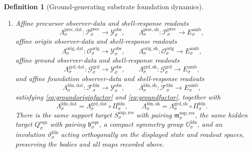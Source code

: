 \documentclass[11pt]{article}
\newcommand{\DataSpace}[1]{\mathcal Y_{#1}^{\mathrm{obs}}}
\newcommand{\AmbientTarget}[1]{E_{#1}^{\mathrm{amb}}}
\newcommand{\ResTarget}[1]{S_{#1}^{\mathrm{sup,res}}}
\newcommand{\ResPair}[1]{\mathfrak m_{#1}^{\mathrm{sup,res}}}
\newcommand{\LiftSelect}[1]{\mathfrak s_{#1}^{\mathrm{lift}}}
\newcommand{\LiftFunctional}[1]{\mathscr V_{#1}^{\mathrm{lift}}}
\newcommand{\PrecSpace}[1]{\mathcal P_{#1}^{\mathrm{prec}}}
\newcommand{\PrecLiftMin}[1]{\mathfrak f_{#1}^{\mathrm{prec}}}
\newcommand{\PrecSubMin}[1]{\mathfrak m_{#1}^{\mathrm{prec}}}
\newcommand{\PrecFunctional}[1]{\mathscr W_{#1}^{\mathrm{prec}}}
\newcommand{\PrecData}[1]{\Lambda_{#1}^{\mathrm{prec,dat}}}
\newcommand{\PrecShellMap}[1]{\Lambda_{#1}^{\mathrm{prec,sh}}}
\newcommand{\OrigSpace}[1]{\mathcal O_{#1}^{\mathrm{orig}}}
\newcommand{\OrigPrecMin}[1]{\mathfrak f_{#1}^{\mathrm{orig,prec}}}
\newcommand{\OrigLiftMin}[1]{\mathfrak f_{#1}^{\mathrm{orig,lift}}}
\newcommand{\OrigSubMin}[1]{\mathfrak m_{#1}^{\mathrm{orig}}}
\newcommand{\OrigFunctional}[1]{\mathscr W_{#1}^{\mathrm{orig}}}
\newcommand{\OrigData}[1]{\Lambda_{#1}^{\mathrm{orig,dat}}}
\newcommand{\OrigShellMap}[1]{\Lambda_{#1}^{\mathrm{orig,sh}}}
\newcommand{\GroundSpace}[1]{\mathcal G_{#1}^{\mathrm{grd}}}
\newcommand{\GroundOrigMin}[1]{\mathfrak f_{#1}^{\mathrm{grd,orig}}}
\newcommand{\GroundPrecMin}[1]{\mathfrak f_{#1}^{\mathrm{grd,prec}}}
\newcommand{\GroundLiftMin}[1]{\mathfrak f_{#1}^{\mathrm{grd,lift}}}
\newcommand{\GroundSubMin}[1]{\mathfrak m_{#1}^{\mathrm{grd}}}
\newcommand{\GroundFunctional}[1]{\mathscr W_{#1}^{\mathrm{grd}}}
\newcommand{\GroundData}[1]{\Lambda_{#1}^{\mathrm{grd,dat}}}
\newcommand{\GroundShellMap}[1]{\Lambda_{#1}^{\mathrm{grd,sh}}}
\newcommand{\FoundSpace}[1]{\mathcal F_{#1}^{\mathrm{fdn}}}
\newcommand{\FoundBody}[1]{\mathcal B_{#1}^{\mathrm{fdn}}}
\newcommand{\FoundProj}[1]{\Pi_{#1}^{\mathrm{fdn}}}
\newcommand{\FoundGroundMin}[1]{\mathfrak f_{#1}^{\mathrm{fdn,grd}}}
\newcommand{\FoundOrigMin}[1]{\mathfrak f_{#1}^{\mathrm{fdn,orig}}}
\newcommand{\FoundPrecMin}[1]{\mathfrak f_{#1}^{\mathrm{fdn,prec}}}
\newcommand{\FoundLiftMin}[1]{\mathfrak f_{#1}^{\mathrm{fdn,lift}}}
\newcommand{\FoundSubMin}[1]{\mathfrak m_{#1}^{\mathrm{fdn}}}
\newcommand{\FoundFunctional}[1]{\mathscr W_{#1}^{\mathrm{fdn}}}
\newcommand{\FoundData}[1]{\Lambda_{#1}^{\mathrm{fdn,dat}}}
\newcommand{\FoundShellMap}[1]{\Lambda_{#1}^{\mathrm{fdn,sh}}}
\newcommand{\FoundSym}[1]{\mathbb G_{#1}^{\mathrm{fdn}}}
\newcommand{\FoundTime}[1]{\vartheta_{#1}^{\mathrm{fdn}}}
\newcommand{\EqnTarget}[1]{Q_{#1}^{\mathrm{eqn}}}
\newcommand{\EqnPair}[1]{\mathfrak b_{#1}^{\mathrm{eqn}}}
\newtheorem{definition}{Definition}
\begin{document}
\begin{definition}[Ground-generating substrate foundation dynamics]
\begin{enumerate}
    Assume that \(\FoundGroundMin{\sigma}\), \(\FoundOrigMin{\sigma}\), \(\FoundPrecMin{\sigma}\), \(\FoundLiftMin{\sigma}\), and \(\FoundSubMin{\sigma}\) are the unique minimizers of \(\FoundFunctional{\sigma}\) on the corresponding ground, origin, precursor, lift, and substrate fibers inside \(\FoundBody{\sigma}\). Assume also that \(\GroundOrigMin{\sigma}\), \(\GroundPrecMin{\sigma}\), \(\GroundLiftMin{\sigma}\), \(\GroundSubMin{\sigma}\), \(\OrigPrecMin{\sigma}\), \(\OrigLiftMin{\sigma}\), \(\OrigSubMin{\sigma}\), \(\PrecLiftMin{\sigma}\), \(\PrecSubMin{\sigma}\), and \(\LiftSelect{\sigma}\) are therefore the corresponding unique minimizers of \(\GroundFunctional{\sigma}\), \(\OrigFunctional{\sigma}\), \(\PrecFunctional{\sigma}\), and \(\LiftFunctional{\sigma}\) on the lower fibers recorded in Definitions \ref{def:ground} and \ref{def:orig}. Finally assume the same lower gap estimates \eqref{eq:origfibergap} and \eqref{eq:origprojectedgap} hold.

    \item Affine precursor observer-data and shell-response readouts
    \[
    \PrecData{\sigma}:\PrecSpace{\sigma}\to\DataSpace{\sigma},
    \qquad
    \PrecShellMap{\sigma}:\PrecSpace{\sigma}\to\AmbientTarget{\sigma},
    \]
    affine origin observer-data and shell-response readouts
    \[
    \OrigData{\sigma}:\OrigSpace{\sigma}\to\DataSpace{\sigma},
    \qquad
    \OrigShellMap{\sigma}:\OrigSpace{\sigma}\to\AmbientTarget{\sigma},
    \]
    affine ground observer-data and shell-response readouts
    \[
    \GroundData{\sigma}:\GroundSpace{\sigma}\to\DataSpace{\sigma},
    \qquad
    \GroundShellMap{\sigma}:\GroundSpace{\sigma}\to\AmbientTarget{\sigma},
    \]
    and affine foundation observer-data and shell-response readouts
    \[
    \FoundData{\sigma}:\FoundSpace{\sigma}\to\DataSpace{\sigma},
    \qquad
    \FoundShellMap{\sigma}:\FoundSpace{\sigma}\to\AmbientTarget{\sigma},
    \]
    satisfying \eqref{eq:groundoriginfactor} and \eqref{eq:groundfactor}, together with
    \begin{equation}
    \FoundData{\sigma}
    =
    \GroundData{\sigma}\circ\FoundProj{\sigma},
    \qquad
    \FoundShellMap{\sigma}
    =
    \GroundShellMap{\sigma}\circ\FoundProj{\sigma}.
    \label{eq:foundfactor}
    \end{equation}
    There is the same support target \(\ResTarget{\sigma}\) with pairing \(\ResPair{\sigma}\), the same hidden target \(\EqnTarget{\sigma}\) with pairing \(\EqnPair{\sigma}\), a compact symmetry group \(\FoundSym{\sigma}\), and an involution \(\FoundTime{\sigma}\) acting orthogonally on the displayed state and readout spaces, preserving the bodies and all maps recorded above.


\end{enumerate}
\end{definition}
\end{document}
